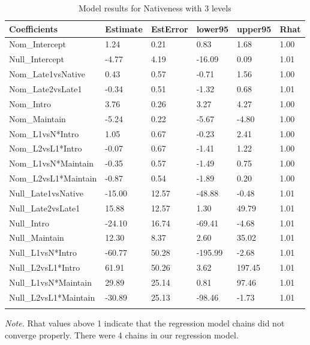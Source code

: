 \documentclass[]{elsarticle} %
\begin{document}
\begin{table}[hbt!]

\begin{center}
\begin{threeparttable}

\caption{\label{tab:unnamed-chunk-4}Model results for Nativeness with 3 levels}

\small{

\begin{tabular}{llllll}
\toprule
Coefficients & \multicolumn{1}{c}{Estimate} & \multicolumn{1}{c}{EstError} & \multicolumn{1}{c}{lower95} & \multicolumn{1}{c}{upper95} & \multicolumn{1}{c}{Rhat}\\
\midrule
Nom\_Intercept & 1.24 & 0.21 & 0.83 & 1.68 & 1.00\\
Null\_Intercept & -4.77 & 4.19 & -16.09 & 0.09 & 1.01\\
Nom\_Late1vsNative & 0.43 & 0.57 & -0.71 & 1.56 & 1.00\\
Nom\_Late2vsLate1 & -0.34 & 0.51 & -1.32 & 0.68 & 1.01\\
Nom\_Intro & 3.76 & 0.26 & 3.27 & 4.27 & 1.00\\
Nom\_Maintain & -5.24 & 0.22 & -5.67 & -4.80 & 1.00\\
Nom\_L1vsN*Intro & 1.05 & 0.67 & -0.23 & 2.41 & 1.00\\
Nom\_L2vsL1*Intro & -0.07 & 0.67 & -1.41 & 1.22 & 1.00\\
Nom\_L1vsN*Maintain & -0.35 & 0.57 & -1.49 & 0.75 & 1.00\\
Nom\_L2vsL1*Maintain & -0.87 & 0.54 & -1.89 & 0.20 & 1.00\\
Null\_Late1vsNative & -15.00 & 12.57 & -48.88 & -0.48 & 1.01\\
Null\_Late2vsLate1 & 15.88 & 12.57 & 1.30 & 49.79 & 1.01\\
Null\_Intro & -24.10 & 16.74 & -69.41 & -4.68 & 1.01\\
Null\_Maintain & 12.30 & 8.37 & 2.60 & 35.02 & 1.01\\
Null\_L1vsN*Intro & -60.77 & 50.28 & -195.99 & -2.68 & 1.01\\
Null\_L2vsL1*Intro & 61.91 & 50.26 & 3.62 & 197.45 & 1.01\\
Null\_L1vsN*Maintain & 29.89 & 25.14 & 0.81 & 97.46 & 1.01\\
Null\_L2vsL1*Maintain & -30.89 & 25.13 & -98.46 & -1.73 & 1.01\\
\bottomrule
\addlinespace
\end{tabular}

}

\begin{tablenotes}[para]
\normalsize{\textit{Note.} Rhat values above 1 indicate that the regression model chains did not converge properly. There were 4 chains in our regression model.}
\end{tablenotes}

\end{threeparttable}
\end{center}

\end{table}
\end{document}
